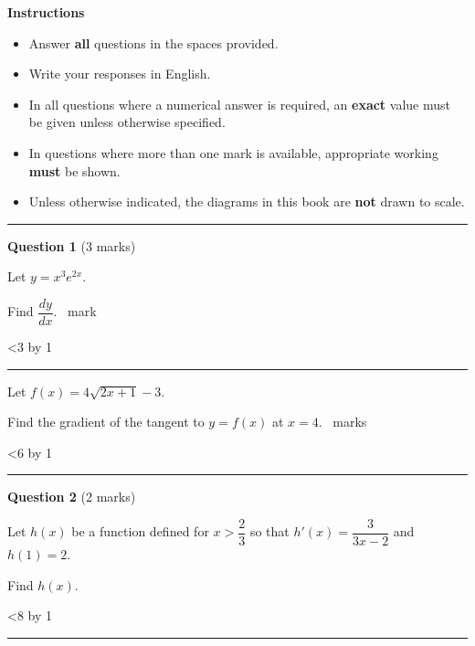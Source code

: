 \documentclass[10pt,twoside]{article}
\newcommand{\question}[2]{%
  \par\vspace{6mm}%
  {\fontsize{10.5}{13}\selectfont\textbf{Question #1} (#2 marks)}\par
  \vspace{1.5mm}}
\newcommand{\qmarks}[1]{%
  \unskip\nobreak\hfill\mbox{\normalfont\fontsize{10.5}{13}\selectfont #1}}
\newcommand{\onemark}{\qmarks{1 mark}}
\newcommand{\nmarks}[1]{\qmarks{#1 marks}}
\newlength{\answerpitch}\setlength{\answerpitch}{9mm}
\newcommand{\answerlines}[1]{%
  \par\vspace{1mm}%
  {\setlength{\baselineskip}{\answerpitch}%
   \lnc=0
   \loop\ifnum\lnc<#1
     \advance\lnc by 1
     \noindent\rule{\dimexpr\linewidth-19mm\relax}{0.4pt}\par
   \repeat}%
  \vspace{4mm}}
\newenvironment{qbody}{\par\qfont\fontsize{11.5}{15}\selectfont}{\par}
\begin{document}
{\fontsize{12}{14}\selectfont\textbf{Instructions}}\par\vspace{1mm}
{\fontsize{10.5}{14}\selectfont
\begin{itemize}[leftmargin=3.6mm,labelsep=2mm,itemsep=0pt,topsep=0pt,parsep=0pt,label=\textbullet]
  \item Answer \textbf{all} questions in the spaces provided.
  \item Write your responses in English.
  \item In all questions where a numerical answer is required, an \textbf{exact} value must be given unless
        otherwise specified.
  \item In questions where more than one mark is available, appropriate working \textbf{must} be shown.
  \item Unless otherwise indicated, the diagrams in this book are \textbf{not} drawn to scale.
\end{itemize}}
\vspace{4mm}
\noindent\rule{\linewidth}{1pt}
\vspace{4mm}

\question{1}{3}
\begin{qbody}
\begin{parts}
  \item Let $y = x^{3}e^{2x}$.\par\vspace{1mm}
        Find $\dfrac{dy}{dx}$.\onemark
        \answerlines{3}
  \item Let $f(x) = 4\sqrt{2x+1} - 3$.\par\vspace{1mm}
        Find the gradient of the tangent to $y = f(x)$ at $x = 4$.\nmarks{2}
        \answerlines{6}
\end{parts}
\end{qbody}

\clearpage
\question{2}{2}
\begin{qbody}
Let $h(x)$ be a function defined for $x > \dfrac{2}{3}$ so that
$h'(x) = \dfrac{3}{3x-2}$ and $h(1) = 2$.\par\vspace{2mm}
Find $h(x)$.
\answerlines{8}
\end{qbody}
\end{document}
